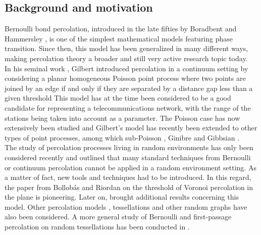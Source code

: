 \documentclass[10pt,a4paper]{amsart}
\theoremstyle{exampstyle}
\theoremstyle{exampnotations}
\begin{document}
\subsection{Background and motivation}
Bernoulli bond percolation, introduced in the late fifties by Boradbent and Hammersley \cite{broadbent1957percolation}, is one of the simplest mathematical models featuring phase transition. Since then, this model has been generalized in many different ways, making percolation theory a broader and still very active research topic today. 
\\ \indent In his seminal work \cite{gilbert1961random}, Gilbert introduced percolation in a continuum setting by considering a planar homogeneous Poisson point process where two points are joined by an edge if and only if they are separated by a distance gap less than a given threshold %
This model has at the time been considered to be a good candidate for representing a telecommunications network, with the range of the stations being taken into account as a parameter. The Poisson case has now extensively been studied \cite{FnT1,meester_continuum_1996} and Gilbert's model has recently been extended to other types of point processes, among which sub-Poisson \cite{blaszczyszyn2010connectivity,blaszczyszyn2013clustering,blaszczyszyn2015clustering} , Ginibre \cite{ghosh2016continuum} and Gibbsian \cite{jansen2016continuum,stucki2013continuum}. 
\\ \indent The study of percolation processes living in random environments has only been considered recently and outlined that many standard techniques from Bernoulli or continuum percolation cannot be applied in a random environment setting.
As a matter of fact, new tools and techniques had to be introduced. In this regard, the paper from Bollob\'as and Riordan \cite{bollobas2006critical} on the threshold of Voronoi percolation in the plane is pioneering. Later on, \cite{ahlberg2016quenched,tassion2016crossing} brought additional results concerning this model. Other percolation models \cite{vahidi1990first}, tessellations \cite{bollobas2008percolation} and other random graphs \cite{balister2008percolation, balister2008percolationknearest,beringer2017percolation} have also been considered. A more general study of Bernoulli and first-passage percolation on random tessellations has been conducted in \cite{ziesche2016bernoulli,ziesche2016first}. 
\end{document}
